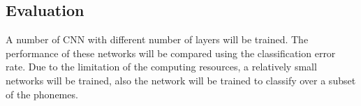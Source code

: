 \subsection{Evaluation}
A number of CNN with different number of layers will be trained. The performance of these networks will be compared using the classification error rate. Due to the limitation of the computing resources, a relatively small networks will be trained, also the network will be trained to classify over a subset of the phonemes.